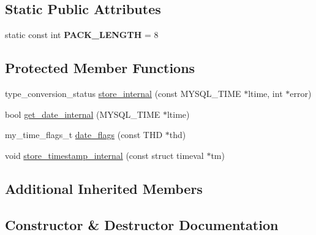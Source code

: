 \subsection*{Static Public Attributes}
\begin{DoxyCompactItemize}
\item 
\mbox{\label{classField__datetime_a724bd8243b0575db15e3b8956116cedd}} 
static const int {\bfseries P\+A\+C\+K\+\_\+\+L\+E\+N\+G\+TH} = 8
\end{DoxyCompactItemize}
\subsection*{Protected Member Functions}
\begin{DoxyCompactItemize}
\item 
type\+\_\+conversion\+\_\+status \mbox{\hyperlink{classField__datetime_a727cd235b40a644b6110ee16b8cef7df}{store\+\_\+internal}} (const M\+Y\+S\+Q\+L\+\_\+\+T\+I\+ME $\ast$ltime, int $\ast$error)
\item 
bool \mbox{\hyperlink{classField__datetime_ad1b048032be351ce7227d8ab6804fc99}{get\+\_\+date\+\_\+internal}} (M\+Y\+S\+Q\+L\+\_\+\+T\+I\+ME $\ast$ltime)
\item 
my\+\_\+time\+\_\+flags\+\_\+t \mbox{\hyperlink{classField__datetime_a893d695981012777af8df5c7fe16769d}{date\+\_\+flags}} (const T\+HD $\ast$thd)
\item 
void \mbox{\hyperlink{classField__datetime_ae05689a45e7e14f5061f75202a6e9280}{store\+\_\+timestamp\+\_\+internal}} (const struct timeval $\ast$tm)
\end{DoxyCompactItemize}
\subsection*{Additional Inherited Members}


\subsection{Constructor \& Destructor Documentation}
\mbox{\label{classField__datetime_a92f5fa57a245b08c63d8c44d7165a449}} 
